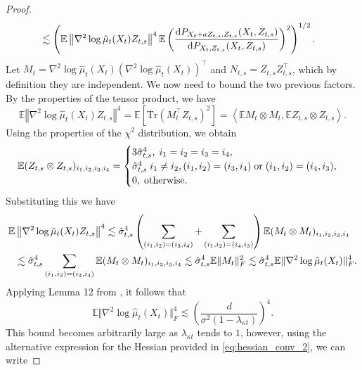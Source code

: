 \begin{proof}
\begin{align*}
    &\lesssim \left(\mathbb{E}\left\Vert  \nabla^2\log \hat{\mu}_t(X_t)Z_{t,s} \right\Vert^4\mathbb{E}\left(\frac{\mathrm{d} P_{X_t + a Z_{t,s}, Z_{t,s}}(X_t, Z_{t,s})}{\mathrm{d} P_{X_t, Z_{t,s}}(X_t, Z_{t,s})}\right)^2\right)^{1/2}.
\end{align*}
Let $M_t = \nabla^2\log \hat{\mu}_t(X_t)\left(\nabla^2\log \hat{\mu}_t(X_t)\right)^\intercal$ and $N_{t,s} = Z_{t,s}Z_{t,s}^\intercal$, which by definition they are independent. We now need to bound the two previous factors. By the properties of the tensor product, we have
\begin{equation*}
    \mathbb{E}\left\Vert  \nabla^2\log \hat{\mu}_t(X_t )Z_{t,s} \right\Vert^4 = \mathbb{E}\left[\text{Tr}\left(M_t^\intercal Z_{t,s}\right)^2\right] = \left\langle \mathbb{E} M_t \otimes M_t, \mathbb{E} Z_{t,s}\otimes Z_{t,s}\right\rangle.
\end{equation*}
Using the properties of the $\chi^2$ distribution, we obtain
\begin{equation*}
    \mathbb{E} (Z_{t,s}\otimes Z_{t,s})_{i_1, i_2, i_3, i_4} = \begin{cases}
        3 \Hat{\sigma}_{t,s}^4, \; i_1=i_2=i_3=i_4, \\
        \Hat{\sigma}_{t,s}^4\; i_1 \neq i_2, (i_1, i_2) = (i_3, i_4) \;\text{or}\; (i_1, i_2) = (i_4, i_3),\\
        0, \;\text{otherwise}.
    \end{cases}
\end{equation*}
Substituting this we have
\begin{align*}
    \mathbb{E}&\left\Vert  \nabla^2\log \hat{\mu}_t(X_t )Z_{t,s} \right\Vert^4 \lesssim \Hat{\sigma}_{t,s}^4 \left(\sum_{ (i_1, i_2) = (i_3, i_4)} + \sum_{ (i_1, i_2) = (i_4, i_3)}\right) \mathbb{E}(M_t\otimes M_t)_{i_1, i_2, i_3, i_4}\\
    &\lesssim \Hat{\sigma}_{t,s}^4 \sum_{ (i_1, i_2) = (i_3, i_4)} \mathbb{E}(M_t\otimes M_t)_{i_1, i_2, i_3, i_4}\lesssim \Hat{\sigma}_{t,s}^4  \mathbb{E}\Vert M_t\Vert_F^2 \lesssim \Hat{\sigma}_{t,s}^4 \mathbb{E}\Vert \nabla^2\log \hat{\mu}_t(X_t)\Vert_F^4.
\end{align*}
Applying Lemma 12 from \citet{Chen2022ImprovedAO}, it follows that
\begin{equation*}
    \mathbb{E}\Vert \nabla^2\log \hat{\mu}_t(X_t)\Vert_F^4 \lesssim \left(\frac{d}{\sigma^2(1-\lambda_{\kappa t})}\right)^4.
\end{equation*}
This bound becomes arbitrarily large as $\lambda_{\kappa t}$ tends to $1$, however, using the alternative expression for the Hessian provided in \eqref{eq:hessian_conv_2}, we can write

\end{proof}
